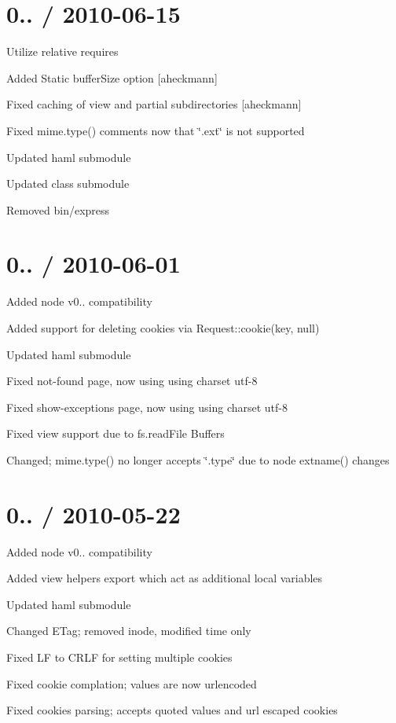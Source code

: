\section*{0.. / 2010-\/06-\/15 }


\begin{DoxyItemize}
\item Utilize relative requires
\item Added Static buffer\+Size option \mbox{[}aheckmann\mbox{]}
\item Fixed caching of view and partial subdirectories \mbox{[}aheckmann\mbox{]}
\item Fixed mime.\+type() comments now that \char`\"{}.\+ext\char`\"{} is not supported
\item Updated haml submodule
\item Updated class submodule
\item Removed bin/express
\end{DoxyItemize}

\section*{0.. / 2010-\/06-\/01 }


\begin{DoxyItemize}
\item Added node v0.. compatibility
\item Added support for deleting cookies via Request\+::cookie(\textquotesingle{}key\textquotesingle{}, null)
\item Updated haml submodule
\item Fixed not-\/found page, now using using charset utf-\/8
\item Fixed show-\/exceptions page, now using using charset utf-\/8
\item Fixed view support due to fs.\+read\+File Buffers
\item Changed; mime.\+type() no longer accepts \char`\"{}.\+type\char`\"{} due to node extname() changes
\end{DoxyItemize}

\section*{0.. / 2010-\/05-\/22 }


\begin{DoxyItemize}
\item Added node v0.. compatibility
\item Added view {\ttfamily helpers} export which act as additional local variables
\item Updated haml submodule
\item Changed E\+Tag; removed inode, modified time only
\item Fixed L\+F to C\+R\+L\+F for setting multiple cookies
\item Fixed cookie complation; values are now urlencoded
\item Fixed cookies parsing; accepts quoted values and url escaped cookies
\end{DoxyItemize}

